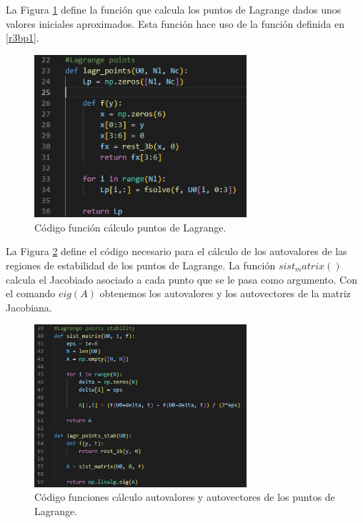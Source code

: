 \documentclass[12pt,a4paper]{article}
\begin{document}
La Figura \ref{r3bp2} define la función que calcula los puntos de Lagrange dados unos valores iniciales aproximados. Esta función hace uso de la función definida en \ref{r3bp1}.
\begin{figure}[H]
	\centering
	\includegraphics[width=0.7\textwidth]{FIGURES/mil6/codigo/r3bp2.JPG}
	\caption{Código función cálculo puntos de Lagrange.}
	\label{r3bp2}
\end{figure}

La Figura \ref{r3bp3} define el código necesario para el cálculo de los autovalores de las regiones de estabilidad de los puntos de Lagrange. La función $sist_matrix()$ calcula el Jacobiado asociado a cada punto que se le pasa como argumento.
Con el comando $eig(A)$ obtenemos los autovalores y los autovectores de la matriz Jacobiana.
\begin{figure}[H]
	\centering
	\includegraphics[width=0.7\textwidth]{FIGURES/mil6/codigo/r3bp3.JPG}
	\caption{Código funciones cálculo autovalores y autovectores de los puntos de Lagrange.}
	\label{r3bp3}
\end{figure}
\end{document}
